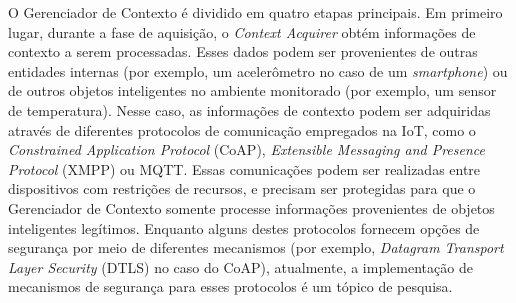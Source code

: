 \documentclass[tid,table]{texufpel} %
\begin{document}
O Gerenciador de Contexto é dividido em quatro etapas principais. Em primeiro lugar, durante a fase de aquisição, o \textit{Context Acquirer} obtém informações de contexto a serem processadas. Esses dados podem ser provenientes de outras entidades internas (por exemplo, um acelerômetro no caso de um \textit{smartphone}) ou de outros objetos inteligentes no ambiente monitorado (por exemplo, um sensor de temperatura). Nesse caso, as informações de contexto podem ser adquiridas através de diferentes protocolos de comunicação empregados na IoT, como o \textit{Constrained Application Protocol} (CoAP), \textit{Extensible Messaging and Presence Protocol} (XMPP) ou MQTT. Essas comunicações podem ser realizadas entre dispositivos com restrições de recursos, e precisam ser protegidas para que o Gerenciador de Contexto somente processe informações provenientes de objetos inteligentes legítimos. Enquanto alguns destes protocolos fornecem opções de segurança por meio de diferentes mecanismos (por exemplo, \textit{Datagram Transport Layer Security} (DTLS) no caso do CoAP), atualmente, a implementação de mecanismos de segurança para esses protocolos é um tópico de pesquisa. %
 
\end{document}

